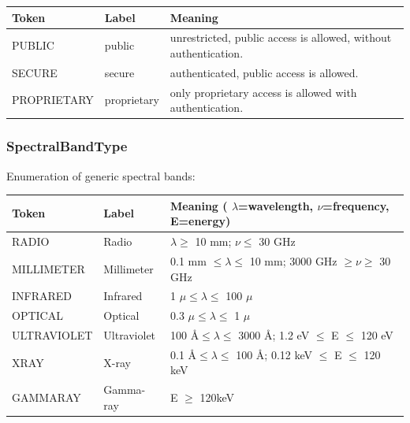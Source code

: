   \begin{table}[h!]
    \small
    \centering
    \renewcommand{\arraystretch}{1.5}
    \begin{tabular}{|p{1.25in}|p{0.75in}|p{3.5in}|}
      \hline 
           \textbf{Token} & \textbf{Label} & \textbf{Meaning}\\
      \hline  
      \hline  
      PUBLIC      & public      & unrestricted, public access is allowed, without authentication. \\
      \hline  
      SECURE      & secure      & authenticated, public access is allowed. \\
      \hline  
      PROPRIETARY & proprietary & only proprietary access is allowed with authentication. \\
      \hline  
    \end{tabular}
  \end{table}
  
  \subsubsection{SpectralBandType}
  \label{sect:band}
  Enumeration of generic spectral bands:
  
  \begin{table}[h!]
    \small
    \centering
    \renewcommand{\arraystretch}{1.5}
    \begin{tabular}{|p{1.25in}|p{0.75in}|p{3.5in}|}
      \hline 
           \textbf{Token} & \textbf{Label} & \textbf{Meaning} ( $\lambda$=wavelength, $\nu$=frequency, E=energy) \\
      \hline  
      \hline  
      RADIO       & Radio       & $\lambda \geq$ 10 mm; $\nu \leq$ 30 GHz \\
      \hline  
      MILLIMETER  & Millimeter  & 0.1 mm $\leq \lambda \leq$ 10 mm; 3000 GHz $\geq \nu \geq$ 30 GHz \\
      \hline  
      INFRARED    & Infrared    & 1 $\mu \leq \lambda \leq$ 100 $\mu$ \\
      \hline  
      OPTICAL     & Optical     & 0.3 $\mu \leq \lambda \leq$ 1 $\mu$ \\
      \hline  
      ULTRAVIOLET & Ultraviolet & 100 \AA $\leq \lambda \leq$ 3000 \AA; 1.2 eV $\leq$ E $\leq$ 120 eV \\
      \hline  
      XRAY        & X-ray       & 0.1 \AA $\leq \lambda \leq$ 100 \AA; 0.12 keV $\leq$ E $\leq$ 120 keV \\
      \hline  
      GAMMARAY    & Gamma-ray   & E $\geq$ 120keV \\
      \hline  
    \end{tabular}
  \end{table}
  

